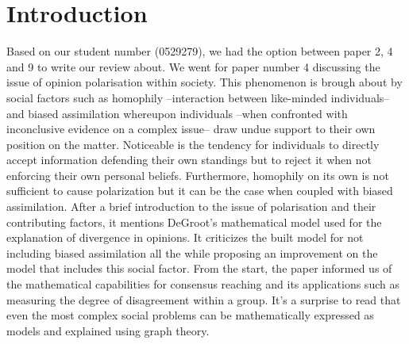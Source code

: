 \documentclass[14]{article}
\begin{document}
\author{\textbf{Faculty of Sciences and Bio-Engineering Sciences}\\[2\baselineskip]\newline\textbf{Arthur Chomé - 0529279}}

\date{ \LARGE Assignment 3: Review}
\title{\vspace{-6cm}}%

\maketitle

\section{Introduction}
Based on our student number (0529279), we had the option between paper 2, 4 and 9 to write our review about. We went for paper number 4\cite{dandekar2013biased} discussing the issue of opinion polarisation within society. 
This phenomenon is brough about by social factors such as homophily --interaction between like-minded individuals-- and biased assimilation whereupon individuals --when confronted with inconclusive evidence on a complex issue-- draw undue support to their own position on the matter. Noticeable is the tendency for individuals to directly accept information defending their own standings but to reject it when not enforcing their own personal beliefs. Furthermore, homophily on its own is not sufficient to cause polarization but it can be the case when coupled with biased assimilation.
\newline
After a brief introduction to the issue of polarisation and their contributing factors, it mentions DeGroot's mathematical model\cite{degroot1974reaching} used for the explanation of divergence in opinions. It criticizes the built model for not including biased assimilation all the while proposing an improvement on the model that includes this social factor. From the start, the paper informed us of the mathematical capabilities for consensus reaching and its applications such as measuring the degree of disagreement within a group. It's a surprise to read that even the most complex social problems can be mathematically expressed as models and explained using graph theory.
\end{document}
